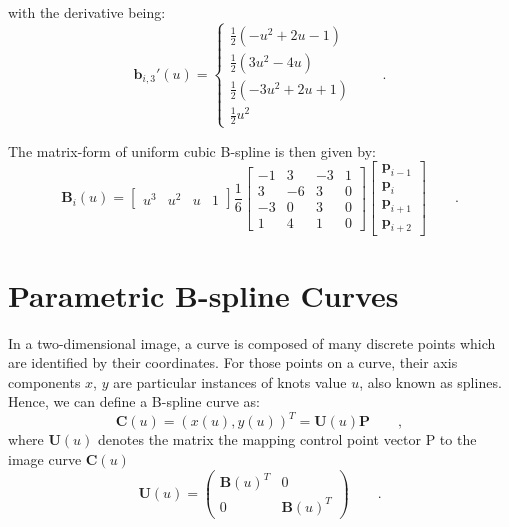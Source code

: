 with the derivative being: 
\begin{equation}
  \label{eq:4.7}
  \mathbf{b}_{i,3}'(u) = \begin{cases} \frac{1}{2}(-u^2+2u-1) \\
    \frac{1}{2}(3u^2 -4u)\\ \frac{1}{2}(-3u^2+2u+1) \\
    \frac{1}{2}u^2
   \end{cases}\qquad .
\end{equation}


The matrix-form of uniform cubic B-spline is then given by:
\begin{equation}
  \label{eq:4.8}
\mathbf{B}_i(u) = \begin{bmatrix} u^3 & u^2 & u & 1 \end{bmatrix} \frac{1}{6} \begin{bmatrix}
-1 &  3 & -3 & 1 \\
 3 & -6 &  3 & 0 \\
-3 &  0 &  3 & 0 \\
 1 &  4 &  1 & 0 \end{bmatrix}
\begin{bmatrix} \mathbf{p}_{i-1} \\ \mathbf{p}_{i} \\ \mathbf{p}_{i+1}
  \\ \mathbf{p}_{i+2} \end{bmatrix}\qquad .
\end{equation}

\section{Parametric B-spline Curves}
\label{sec:pbc}

In a two-dimensional image, a curve is composed of many discrete points which are
identified by their coordinates. For those points on a curve, their axis
components $x$, $y$ are particular instances of knots value $u$, also known
as splines. Hence, we can define a B-spline curve as:
\begin{equation}
  \label{eq:paramcurve}
  \mathbf{C}(u) = (x(u),y(u))^T = \mathbf{U}(u) \mathbf{P} \qquad ,
\end{equation}
where $\mathbf{U}(u)$ denotes the matrix the mapping control point
vector P to the image
curve $\mathbf{C}(u)$
\begin{equation}
  \label{eq:4.12}
  \mathbf{U}(u) =   \begin{pmatrix}
\mathbf{B}(u)^T & 0 \\
0 &\mathbf{B}(u)^T
  \end{pmatrix}\qquad .
\end{equation}

